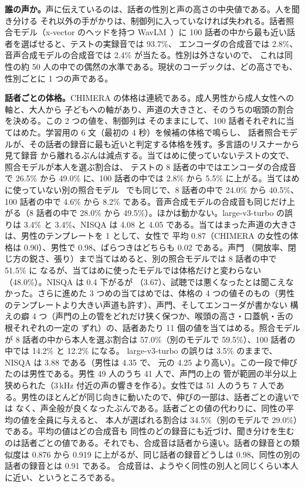 \documentclass[10pt,a4paper,twocolumn]{article}
\begin{document}
\textbf{誰の声か。}声に伝えているのは、話者の性別と声の高さの中央値である。人を聞き分ける
それ以外の手がかりは、制御列に入っていなければ失われる。話者照合モデル（x-vector のヘッドを持つ
WavLM~\cite{wavlm}）に 100 話者の中から最も近い話者を選ばせると、テストの実録音では 93.7\%、
エンコーダの合成音では 2.8\%、音声合成モデルの合成音では 2.4\% が当たる。性別は外さないので、
これは同性の約 50 人の中での偶然の水準である。現状のコーデックは、どの高さでも、性別ごとに
1 つの声である。

\textbf{話者ごとの体格。}CHIMERA の体格は連続である。成人男性から成人女性への軸と、大人から
子どもへの軸があり、声道の大きさと、そのうちの咽頭の割合を決める。この 2 つの値を、制御列は
そのままにして、100 話者それぞれに当てはめた。学習用の 6 文（最初の 4 秒）を候補の体格で鳴らし、
話者照合モデルが、その話者の録音に最も近いと判定する体格を残す。多言語のリスナーから見て録音
から離れるぶんは減点する。当てはめに使っていないテストの文で、照合モデルが本人を選ぶ割合は、
テストの 8 話者の中ではエンコーダの合成音で 26.5\% から 49.0\% に、100 話者の中では
2.8\% から 5.5\% に上がる。当てはめに使っていない別の照合モデル~\cite{unispeechsat}
でも同じで、8 話者の中で 24.0\% から 40.5\%、100 話者の中で 4.6\% から
8.2\% である。音声合成モデルの合成音も同じだけ上がる（8 話者の中で 28.0\% から
49.5\%）。ほかは動かない。large-v3-turbo の誤りは 3.4\% と 3.4\%、NISQA は
4.08 と 4.05 である。当てはまった声道の大きさは、男性のテンプレートを 1 として、女性で
平均 0.87（CHIMERA の女性の体格は 0.90）、男性で 0.98、ばらつきはどちらも 0.02 である。声門
（開放率、閉じ方の鋭さ、張り）まで当てはめると、別の照合モデルでは 8 話者の中で 51.5\% に
なるが、当てはめに使ったモデルでは体格だけと変わらない（48.0\%）。NISQA は 0.4 下がるが
（3.67）、試聴では悪くなったとは聞こえなかった。さらに進めた 3 つめの当てはめでは、体格の
4 つの値そのもの（男性のテンプレートより大きい声道も許す）、声門、そしてエンコーダが書かない
構えの癖 4 つ（声門の上の管をどれだけ狭く保つか、喉頭の高さ・口蓋帆・舌の根それぞれの一定の
ずれ）の、話者あたり 11 個の値を当てはめる。照合モデルが 8 話者の中から本人を選ぶ割合は
57.0\%（別のモデルで 59.5\%）、100 話者の中では 14.2\% と 12.2\% になる。
large-v3-turbo の誤りは 3.5\% のままで、NISQA は 3.88 である（男性は 4.35 で、
元の 4.25 より高い）。この一段で伸びたのは男性である。男性 49 人のうち 41 人で、声門の上の
管が範囲の半分以上狭められた（3\,kHz 付近の声の響きを作る）。女性では 51 人のうち
7 人である。男性のほとんどが同じ向きに動いたので、伸びの一部は、話者ごとの違いでは
なく、声全般が良くなったぶんである。話者ごとの値の代わりに、同性の平均の値を全員に与えると、
本人が選ばれる割合は 34.5\%（別のモデルで 29.0\%）である。平均の値はどの合成音も
同性のどの録音にも近づけ、聞き分けを生むのは話者ごとの値である。それでも、合成音は話者から遠い。話者の録音との類似度は 0.876 から
0.919 に上がるが、同じ話者の録音どうしは 0.98、同性の別の話者の録音とは 0.91 である。
合成音は、ようやく同性の別人と同じくらい本人に近い、というところである。
\end{document}
